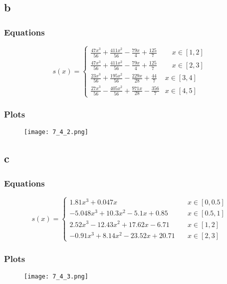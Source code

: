 \documentclass{article}
\begin{document}
\subsection{b}
\subsubsection{Equations}
$$
s(x) = \left\{
        \begin{array}{ll}
            \frac{47 x^{3}}{56} + \frac{411 x^{2}}{56} - \frac{79 x}{4} + \frac{125}{7} & \quad x \in [1,2] \\
            \frac{47 x^{3}}{56} + \frac{411 x^{2}}{56} - \frac{79 x}{4} + \frac{125}{7} & \quad x \in [2,3] \\
            \frac{23 x^{3}}{56} + \frac{195 x^{2}}{56} - \frac{229 x}{28} + \frac{44}{7} & x\in [3,4]\\
            \frac{27 x^{3}}{56} - \frac{405 x^{2}}{56} + \frac{971 x}{28} - \frac{356}{7} & x\in [4,5]
        \end{array}
    \right.
$$

\subsubsection{Plots}
\begin{figure}[H]
\centering
\texttt{[image: 7\_4\_2.png]}
\caption{}
\end{figure}

\newpage
\subsection{c}
\subsubsection{Equations}
$$
s(x) = \left\{
        \begin{array}{ll}
            1.81 x^{3} + 0.047 x & \quad x \in [0,0.5] \\
            - 5.048 x^{3} + 10.3 x^{2} - 5.1 x + 0.85 & \quad x \in [0.5,1] \\
            2.52 x^{3} - 12.43 x^{2} + 17.62 x - 6.71 & \quad x\in [1,2]\\
            - 0.91 x^{3} + 8.14 x^{2} - 23.52 x + 20.71 & \quad x\in [2,3]
        \end{array}
    \right.
$$

\subsubsection{Plots}
\begin{figure}[H]
\centering
\texttt{[image: 7\_4\_3.png]}
\caption{}
\end{figure}
\end{document}
